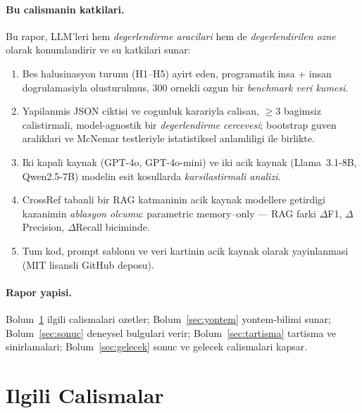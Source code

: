 \documentclass[11pt,a4paper]{article}
\begin{document}
\paragraph{Bu calismanin katkilari.}
Bu rapor, LLM'leri hem \emph{degerlendirme aracilari} hem de
\emph{degerlendirilen ozne} olarak konumlandirir ve su katkilari sunar:

\begin{enumerate}[nosep]
\item Bes halusinasyon turunu (H1--H5) ayirt eden, programatik insa + insan
dogrulamasiyla olusturulmus, 300 ornekli ozgun bir \emph{benchmark veri
kumesi}.
\item Yapilanmis JSON ciktisi ve cogunluk karariyla calisan, $\geq$3 bagimsiz
calistirmali, model-agnostik bir \emph{degerlendirme cercevesi};
bootstrap guven araliklari ve McNemar testleriyle istatistiksel anlamliligi
ile birlikte.
\item Iki kapali kaynak (GPT-4o, GPT-4o-mini) ve iki acik kaynak (Llama~3.1-8B,
Qwen2.5-7B) modelin esit kosullarda \emph{karsilastirmali analizi}.
\item CrossRef tabanli bir RAG katmaninin acik kaynak modellere getirdigi
kazanimin \emph{ablasyon olcumu}: parametric memory--only --- {} RAG farki
$\Delta$F1, $\Delta$Precision, $\Delta$Recall biciminde.
\item Tum kod, prompt sablonu ve veri kartinin acik kaynak olarak
yayinlanmasi (MIT lisansli GitHub deposu).
\end{enumerate}

\paragraph{Rapor yapisi.}
Bolum~\ref{sec:related} ilgili calismalari ozetler; Bolum~\ref{sec:yontem}
yontem-bilimi sunar; Bolum~\ref{sec:sonuc} deneysel bulgulari verir;
Bolum~\ref{sec:tartisma} tartisma ve sinirlamalari; Bolum~\ref{sec:gelecek}
sonuc ve gelecek calismalari kapsar.

\section{Ilgili Calismalar}
\label{sec:related}
\end{document}
